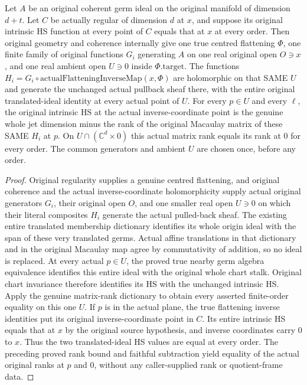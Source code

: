 \begin{theorem}
\label{hir:actual-hs-constant-centre-common-real-jet-ranks}
Let $A$ be an original coherent germ ideal on the original manifold
of dimension $d+t$. Let $C$ be actually regular of dimension $d$ at
$x$, and suppose its original intrinsic HS function at every point
of $C$ equals that at $x$ at every order. Then original geometry and
coherence internally give one true centred flattening $\Phi$, one
finite family of original functions $G_i$ generating $A$ on one real
original open $O\ni x$, and one real ambient open $U\ni0$ inside
$\Phi.\mathrm{target}$. The functions
$H_i=G_i\circ\mathrm{actualFlatteningInverseMap}(x,\Phi)$ are
holomorphic on that SAME $U$ and generate the unchanged actual
pullback sheaf there, with the entire original translated-ideal
identity at every actual point of $U$.
For every $p\in U$ and every $\ell$, the original intrinsic HS at
the actual inverse-coordinate point is the genuine whole jet dimension
minus the rank of the original Macaulay matrix of these SAME $H_i$
at $p$. On $U\cap(\mathbb C^d\times0)$ this actual matrix rank
equals its rank at $0$ for every order. The common generators and
ambient $U$ are chosen once, before any order.
\leanok
\end{theorem}
\begin{proof}
Original regularity supplies a genuine centred flattening, and original
coherence and the actual inverse-coordinate holomorphicity supply
actual original generators $G_i$, their original open $O$, and one
smaller real open $U\ni0$ on which their literal composites $H_i$
generate the actual pulled-back sheaf. The existing entire translated
membership dictionary identifies its whole origin ideal with the
span of these very translated germs. Actual affine translations in
that dictionary and in the original Macaulay map agree by commutativity
of addition, so no ideal is replaced.
At every actual $p\in U$, the proved true nearby germ algebra
equivalence identifies this entire ideal with the original whole chart
stalk. Original chart invariance therefore identifies its HS with the
unchanged intrinsic HS. Apply the genuine matrix-rank dictionary to
obtain every asserted finite-order equality on this one $U$.
If $p$ is in the actual plane, the true flattening inverse identities
put its original inverse-coordinate point in $C$. Its entire intrinsic
HS equals that at $x$ by the original source hypothesis, and inverse
coordinates carry $0$ to $x$. Thus the two translated-ideal HS values
are equal at every order. The preceding proved rank bound and faithful
subtraction yield equality of the actual original ranks at $p$ and
$0$, without any caller-supplied rank or quotient-frame data.
\end{proof}

